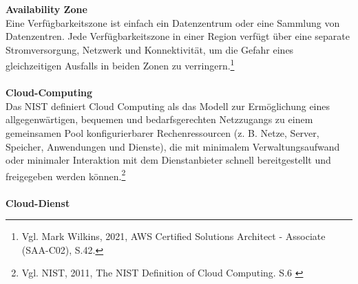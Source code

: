 \textbf{Availability Zone}\\
Eine Verfügbarkeitszone ist einfach ein Datenzentrum oder eine Sammlung von Datenzentren. Jede Verfügbarkeitszone in einer Region verfügt über eine separate Stromversorgung, Netzwerk und Konnektivität, um die Gefahr eines gleichzeitigen Ausfalls in beiden Zonen zu verringern.\footnote{Vgl. Mark Wilkins, 2021, AWS Certified Solutions Architect - Associate (SAA-C02), S.42.\cite{AWS1}}
\\\\
\textbf{Cloud-Computing}\\
Das NIST definiert Cloud Computing als das Modell zur Ermöglichung eines allgegenwärtigen, bequemen und bedarfsgerechten Netzzugangs zu einem gemeinsamen Pool konfigurierbarer Rechenressourcen (z. B. Netze, Server, Speicher, Anwendungen und Dienste), die mit minimalem Verwaltungsaufwand oder minimaler Interaktion mit dem Dienstanbieter schnell bereitgestellt und freigegeben werden können.\footnote{Vgl. NIST, 2011, The NIST Definition of Cloud Computing. S.6 \cite{CC1}}
\\\\
\textbf{Cloud-Dienst}\\
